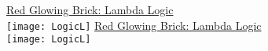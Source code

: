 \documentclass[white]{GL2020}
\begin{document}
\name{\wLogicLambda{}}

\vspace*{0.5cm}
\begin{center}
{\LARGE \underline{Red Glowing Brick: Lambda Logic}}\\
\vspace{0.5cm}
\texttt{[image: LogicL]}
\vfill
{\LARGE \underline{Red Glowing Brick: Lambda Logic}}\\
\vspace{0.5cm}
\texttt{[image: LogicL]}
\end{center}
\end{document}
